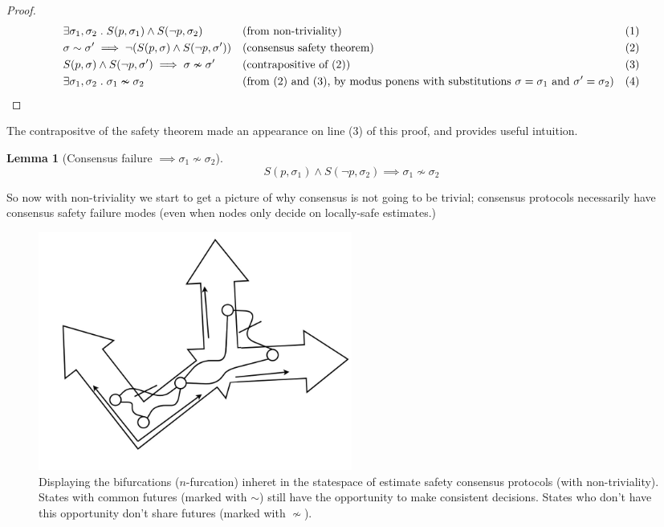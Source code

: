 \documentclass{article}
\theoremstyle{definition}
\newtheorem{lemma}{Lemma}
\begin{document}
\begin{proof}
\begin{align*}
  &\exists \sigma_1, \sigma_2 \hspace{1mm} . \hspace{1mm}S(p,\sigma_1) \land S(\neg{p},\sigma_2) &&\text{(from non-triviality)} &&\text{(1)}\\
  &\sigma \sim \sigma' \implies \neg(S(p,\sigma) \land S(\neg{p},\sigma')) &&\text{(consensus safety theorem)} &&\text{(2)}\\
  &S(p,\sigma) \land S(\neg{p},\sigma') \implies \sigma \nsim \sigma' &&\text{(contrapositive of (2))} &&\text{(3)}\\
  &\exists \sigma_1, \sigma_2 \hspace{1mm} . \hspace{1mm}\sigma_1 \nsim \sigma_2 \hspace{5mm} \qedhere &&\text{(from (2) and (3), by modus ponens with substitutions $\sigma=\sigma_1$ and $\sigma'=\sigma_2$)} &&\text{(4)}\\
\end{align*}
\end{proof}

The contrapositve of the safety theorem made an appearance on line (3) of this proof, and provides useful intuition.

\begin{lemma}[Consensus failure $\implies \sigma_1 \nsim \sigma_2$]
$$
S(p,\sigma_1) \land S(\neg{p},\sigma_2) \implies \sigma_1 \nsim \sigma_2
$$
\end{lemma}

So now with non-triviality we start to get a picture of why consensus is not going to be trivial; consensus protocols necessarily have consensus safety failure modes (even when nodes only decide on locally-safe estimates.)

\begin{figure}[!htb]
\centering
\includegraphics[width=0.5\textwidth]{sharedfutures}
\caption{Displaying the bifurcations ($n$-furcation) inheret in the statespace of estimate safety consensus protocols (with non-triviality). States with common futures (marked with $\sim$) still have the opportunity to make consistent decisions. States who don't have this opportunity don't share futures (marked with $\nsim$).}
\end{figure}
\end{document}

